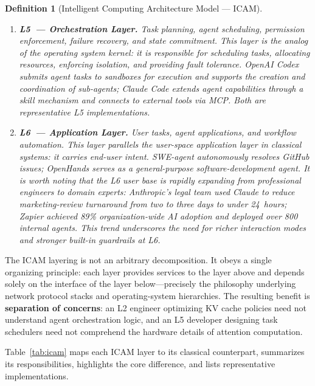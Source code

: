 \documentclass[11pt,a4paper]{article}
\newtheorem{definition}{Definition}[section]
\begin{document}
\begin{definition}[Intelligent Computing Architecture Model --- ICAM]
\begin{enumerate}[nosep]
\item \textbf{L5~--- Orchestration Layer.}
Task planning, agent scheduling, permission enforcement, failure recovery, and state commitment. This layer is the analog of the operating system kernel: it is responsible for scheduling tasks, allocating resources, enforcing isolation, and providing fault tolerance. OpenAI Codex submits agent tasks to sandboxes for execution and supports the creation and coordination of sub-agents\cite{openai_codex_overview_2026,openai_codex_subagents_2026}; Claude Code extends agent capabilities through a skill mechanism and connects to external tools via MCP\cite{anthropic_claudecode_overview_2026,anthropic_claudecode_skills_2026}. Both are representative L5 implementations.

\item \textbf{L6~--- Application Layer.}
User tasks, agent applications, and workflow automation. This layer parallels the user-space application layer in classical systems: it carries end-user intent. SWE-agent autonomously resolves GitHub issues\cite{sweagent2024}; OpenHands serves as a general-purpose software-development agent\cite{openhands_paper_2025}. It is worth noting that the L6 user base is rapidly expanding from professional engineers to domain experts: Anthropic's legal team used Claude to reduce marketing-review turnaround from two to three days to under 24~hours; Zapier achieved 89\% organization-wide AI adoption and deployed over 800 internal agents\cite{anthropic2026agenticreport}. This trend underscores the need for richer interaction modes and stronger built-in guardrails at L6.
\end{enumerate}
\end{definition}

The ICAM layering is not an arbitrary decomposition. It obeys a single organizing principle: each layer provides services to the layer above and depends solely on the interface of the layer below---precisely the philosophy underlying network protocol stacks and operating-system hierarchies. The resulting benefit is \textbf{separation of concerns}: an L2 engineer optimizing KV cache policies need not understand agent orchestration logic, and an L5 developer designing task schedulers need not comprehend the hardware details of attention computation.

Table~\ref{tab:icam} maps each ICAM layer to its classical counterpart, summarizes its responsibilities, highlights the core difference, and lists representative implementations.
\end{document}
